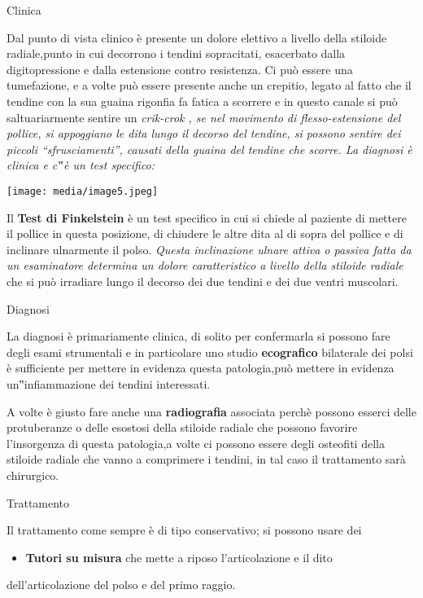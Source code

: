 \documentclass[]{article}
\begin{document}
Clinica

Dal punto di vista clinico è presente un dolore elettivo a livello della
stiloide radiale,punto in cui decorrono i tendini sopracitati,
esacerbato dalla digitopressione e dalla estensione contro resistenza.
Ci può essere una tumefazione, e a volte può essere presente anche un
crepitio, legato al fatto che il tendine con la sua guaina rigonfia fa
fatica a scorrere e in questo canale si può saltuariarmente sentire un
\emph{crik-crok , se nel movimento di flesso-estensione del pollice, si
appoggiano le dita lungo il decorso del tendine, si possono sentire dei
piccoli ``sfrusciamenti'', causati della guaina del tendine che scorre.
La diagnosi è clinica e c‟è un test specifico: }

\texttt{[image: media/image5.jpeg]}

Il \textbf{Test di Finkelstein} è un test specifico in cui si chiede al
paziente di mettere il pollice in questa posizione, di chiudere le altre
dita al di sopra del pollice e di inclinare ulnarmente il polso.
\emph{Questa inclinazione ulnare attiva o passiva fatta da un
esaminatore determina un dolore caratteristico a livello della stiloide
radiale} che si può irradiare lungo il decorso dei due tendini e dei due
ventri muscolari.

Diagnosi

La diagnosi è primariamente clinica, di solito per confermarla si
possono fare degli esami strumentali e in particolare uno studio
\textbf{ecografico} bilaterale dei polsi è sufficiente per mettere in
evidenza questa patologia,può mettere in evidenza un‟infiammazione dei
tendini interessati.

A volte è giusto fare anche una \textbf{radiografia} associata perchè
possono esserci delle protuberanze o delle esostosi della stiloide
radiale che possono favorire l'insorgenza di questa patologia,a volte ci
possono essere degli osteofiti della stiloide radiale che vanno a
comprimere i tendini, in tal caso il trattamento sarà chirurgico.

Trattamento

Il trattamento come sempre è di tipo conservativo; si possono usare dei

\begin{itemize}
\item
  \textbf{Tutori su misura} che mette a riposo l'articolazione e il dito
\end{itemize}

dell'articolazione del polso e del primo raggio.
\end{document}
